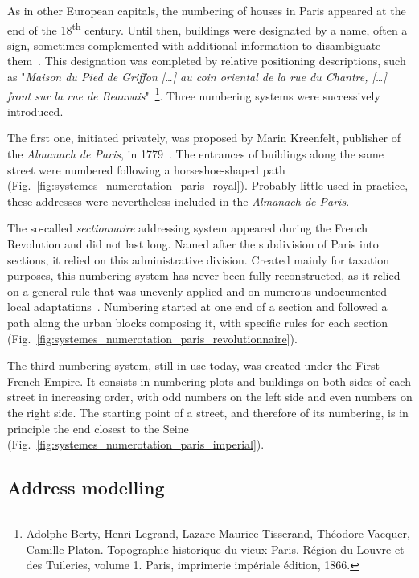 As in other European capitals, the numbering of houses in Paris appeared at the end of the 18\textsuperscript{th} century.
Until then, buildings were designated by a name, often a sign, sometimes complemented with additional information to disambiguate them~\cite{pronteau_les_1966}.
This designation was completed by relative positioning descriptions, such as "\textit{Maison du Pied de Griffon […] au coin oriental de la rue du Chantre, […] front sur la rue de Beauvais}"~\footnote{Adolphe Berty, Henri Legrand, Lazare-Maurice Tisserand, Théodore Vacquer, Camille Platon. Topographie historique du vieux Paris. Région du Louvre et des Tuileries, volume 1. Paris, imprimerie impériale édition, 1866.}.
Three numbering systems were successively introduced.

The first one, initiated privately, was proposed by Marin Kreenfelt, publisher of the \textit{Almanach de Paris}, in 1779~\cite{depaulis_vaugeois_2016}.
The entrances of buildings along the same street were numbered following a horseshoe-shaped path (Fig.~\ref{fig:systemes_numerotation_paris_royal}).
Probably little used in practice, these addresses were nevertheless included in the \textit{Almanach de Paris}.

The so-called \textit{sectionnaire} addressing system appeared during the French Revolution and did not last long.
Named after the subdivision of Paris into sections, it relied on this administrative division.
Created mainly for taxation purposes, this numbering system has never been fully reconstructed, as it relied on a general rule that was unevenly applied and on numerous undocumented local adaptations~\cite{fleury_concordance_1995,waquet_almanachs_2018}.
Numbering started at one end of a section and followed a path along the urban blocks composing it, with specific rules for each section (Fig.~\ref{fig:systemes_numerotation_paris_revolutionnaire}).

The third numbering system, still in use today, was created under the First French Empire.
It consists in numbering plots and buildings on both sides of each street in increasing order, with odd numbers on the left side and even numbers on the right side.
The starting point of a street, and therefore of its numbering, is in principle the end closest to the Seine (Fig.~\ref{fig:systemes_numerotation_paris_imperial}).

\subsection{Address modelling}
\label{subsect:representation_adresses}

